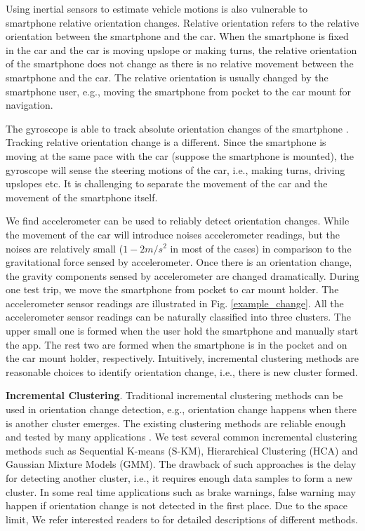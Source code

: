 Using inertial sensors to estimate vehicle motions
is also vulnerable to smartphone relative orientation changes. 
Relative orientation refers to the relative orientation 
between the smartphone and the car.  
When the smartphone is fixed in the car and 
the car is moving upslope or making turns, the
relative orientation of the smartphone does not change 
as there is no relative movement between the smartphone
and the car.  
The relative orientation is usually changed by the smartphone
user, e.g., moving the smartphone from pocket to the car mount
for navigation.



The gyroscope is able to track absolute orientation changes
of the smartphone \cite{zhou2014use}. 
Tracking relative orientation change is a different. 
Since the smartphone is moving at the same pace 
with the car (suppose the smartphone is mounted), 
the gyroscope will sense the steering motions of the 
car, i.e., making turns, driving upslopes etc. 
It is challenging to separate the movement of the car
and the movement of the smartphone itself. 


We find accelerometer can be used to reliably detect orientation changes. 
While the movement of the car will introduce noises accelerometer
readings, but the noises are relatively small ($1-2m/s^2$ in most of the cases) 
in comparison to the gravitational force sensed by accelerometer. 
Once there is an orientation change, the gravity components
sensed by accelerometer are changed dramatically.
During one test trip, we move the smartphone
from pocket to car mount holder. 
The accelerometer sensor readings are illustrated in Fig. \ref{example_change}. 
All the accelerometer sensor readings can be naturally
classified into three clusters. 
The upper small one is formed when the user hold
the smartphone and manually start the app. 
The rest two are formed when the smartphone is in 
the pocket and on the car mount holder, respectively. 
Intuitively, incremental clustering methods are reasonable 
choices to identify orientation change, 
i.e., there is new cluster formed. 


\textbf{Incremental Clustering}. Traditional incremental clustering methods can be used in 
orientation change detection, e.g., 
orientation change happens when there is another cluster
emerges. 
The existing clustering methods are reliable enough
and tested by many applications 
\cite{nguyen2015survey, ordonez2003clustering, rodrigues2008hierarchical, song2005highly}. 
We test several common incremental clustering methods 
such as Sequential K-means (S-KM), Hierarchical Clustering (HCA) 
and Gaussian Mixture Models (GMM). 
The drawback of such approaches is the delay for detecting
another cluster, i.e., it requires enough data samples
to form a new cluster. 
In some real time applications such as brake warnings, 
false warning may happen if orientation change
is not detected in the first place. 
Due to the space limit, We refer interested 
readers to \cite{nguyen2015survey} for 
detailed descriptions of different methods.


